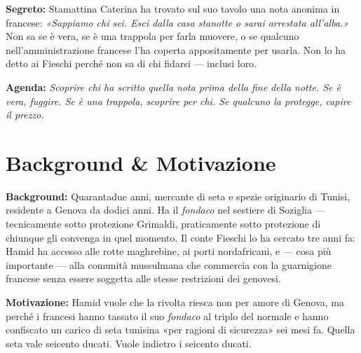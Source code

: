 \clearpage

\begin{secretbox}
  \textbf{Segreto:} Stamattina Caterina ha trovato sul suo tavolo una nota
  anonima in francese: \textit{«Sappiamo chi sei. Esci dalla casa stanotte
  o sarai arrestata all'alba.»} Non sa se è vera, se è una trappola per
  farla muovere, o se qualcuno nell'amministrazione francese l'ha coperta
  appositamente per usarla. Non lo ha detto ai Fieschi perché non sa di chi
  fidarsi — inclusi loro.

  \medskip\noindent\textcolor{SecretRed}{\textbf{Agenda:}}
  \textit{Scoprire chi ha scritto quella nota prima della fine della notte.
  Se è vera, fuggire. Se è una trappola, scoprire per chi. Se qualcuno
  la protegge, capire il prezzo.}
\end{secretbox}

\clearpage



\section*{Background \& Motivazione}

\begin{rulebox}{}
  \textbf{Background:} Quarantadue anni, mercante di seta e spezie originario
  di Tunisi, residente a Genova da dodici anni. Ha il \textit{fondaco} nel
  sestiere di Soziglia — tecnicamente sotto protezione Grimaldi, praticamente
  sotto protezione di chiunque gli convenga in quel momento. Il conte Fieschi
  lo ha cercato tre anni fa: Hamid ha accesso alle rotte maghrebine, ai porti
  nordafricani, e — cosa più importante — alla comunità mussulmana che
  commercia con la guarnigione francese senza essere soggetta alle stesse
  restrizioni dei genovesi.

  \medskip\noindent\textcolor{FieschiGreen}{\textbf{Motivazione:}} Hamid
  vuole che la rivolta riesca non per amore di Genova, ma perché i francesi
  hanno tassato il suo \textit{fondaco} al triplo del normale e hanno
  confiscato un carico di seta tunisina «per ragioni di sicurezza» sei mesi
  fa. Quella seta vale seicento ducati. Vuole indietro i seicento ducati.
\end{rulebox}

